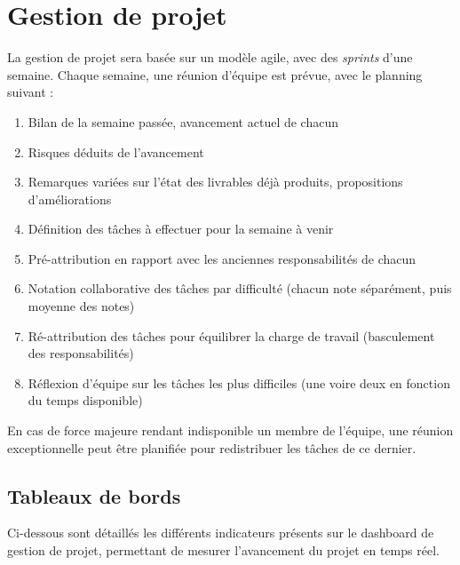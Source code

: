 \section{Gestion de projet}

La gestion de projet sera basée sur un modèle agile, avec des \textit{sprints}
d'une semaine. Chaque semaine, une réunion d'équipe est prévue, avec le
planning suivant :

\begin{enumerate}
    \item Bilan de la semaine passée, avancement actuel de chacun
    \item Risques déduits de l'avancement
    \item Remarques variées sur l'état des livrables déjà produits,
        propositions d'améliorations
    \item Définition des tâches à effectuer pour la semaine à venir
    \item Pré-attribution en rapport avec les anciennes responsabilités de
        chacun
    \item Notation collaborative des tâches par difficulté (chacun note
        séparément, puis moyenne des notes)
    \item Ré-attribution des tâches pour équilibrer la charge de travail
        (basculement des responsabilités)
    \item Réflexion d'équipe sur les tâches les plus difficiles (une voire deux
        en fonction du temps disponible)
\end{enumerate}

En cas de force majeure rendant indisponible un membre de l'équipe, une réunion
exceptionnelle peut être planifiée pour redistribuer les tâches de ce dernier.

\subsection{Tableaux de bords}

Ci-dessous sont détaillés les différents indicateurs présents sur le dashboard
de gestion de projet, permettant de mesurer l'avancement du projet en temps
réel.

